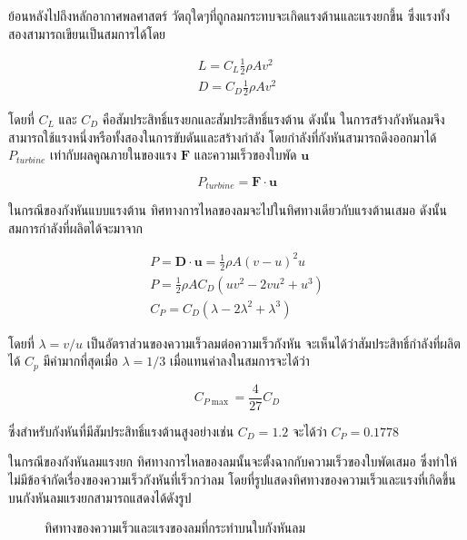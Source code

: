 \documentclass[a4paper,nobib,openany,10pt]{tufte-book}
\begin{document}
ย้อนหลังไปถึงหลักอากาศพลศาสตร์
วัตถุใดๆที่ถูกลมกระทบจะเกิดแรงต้านและแรงยกขึ้น
ซึ่งแรงทั้งสองสามารถเขียนเป็นสมการได้โดย

\[\begin{aligned}
  L = C_L \frac{1}{2} \rho A v^2 \\
  D = C_D \frac{1}{2} \rho A v^2\end{aligned}\]

โดยที่ \(C_L\) และ \(C_D\) คือสัมประสิทธิ์แรงยกและสัมประสิทธิ์แรงต้าน
ดังนั้น
ในการสร้างกังหันลมจึงสามารถใช้แรงหนึ่งหรือทั้งสองในการขับดันและสร้างกำลัง
โดยกำลังที่กังหันสามารถดึงออกมาได้ \(P_{turbine}\)
เท่ากับผลคูณภายในของแรง \(\mathbf{F}\) และความเร็วของใบพัด
\(\mathbf{u}\)

\[P_{turbine} = \mathbf{F} \cdot \mathbf{u}\]

ในกรณีของกังหันแบบแรงต้าน
ทิศทางการไหลของลมจะไปในทิศทางเดียวกับแรงต้านเสมอ
ดังนั้นสมการกำลังที่ผลิตได้จะมาจาก

\[\begin{gathered}
  P = \mathbf{D} \cdot \mathbf{u} = \frac{1}{2} \rho A (v - u)^2 u \nonumber \\
  P = \frac{1}{2} \rho A C_D (uv^2 - 2vu^2 + u^3) \nonumber \\
  C_P = C_D \left( \lambda - 2\lambda^2 + \lambda^3 \right)\end{gathered}\]

โดยที่ \(\lambda = v / u\) เป็นอัตราส่วนของความเร็วลมต่อความเร็วกังหัน
จะเห็นได้ว่าสัมประสิทธิ์กำลังที่ผลิตได้ \(C_p\) มีค่ามากที่สุดเมื่อ
\(\lambda = 1/3\) เมื่อแทนค่าลงในสมการจะได้ว่า

\[C_{P \max} = \dfrac{4}{27}C_D\]

ซึ่งสำหรับกังหันที่มีสัมประสิทธิ์แรงต้านสูงอย่างเช่น \(C_D = 1.2\)
จะได้ว่า \(C_P = 0.1778\)

ในกรณีของกังหันลมแรงยก
ทิศทางการไหลของลมนั้นจะตั้งฉากกับความเร็วของใบพัดเสมอ
ซึ่งทำให้ไม่มีข้อจำกัดเรื่องของความเร็วกังหันที่เร็วกว่าลม
โดยที่รูปแสดงทิศทางของความเร็วและแรงที่เกิดขึ้นบนกังหันลมแรงยกสามารถแสดงได้ดังรูป

\begin{figure}
  \centering
  \caption{ทิศทางของความเร็วและแรงของลมที่กระทำบนใบกังหันลม}
\end{figure}
\end{document}
